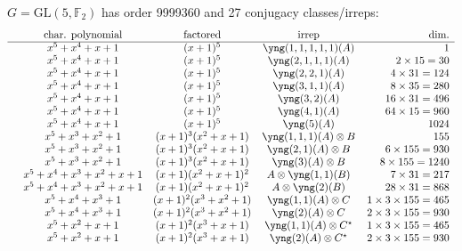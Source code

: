 \documentclass[11pt,oneside]{article}
\newcommand{\GL}{\mathrm{GL}}
\newcommand{\Field}{\mathbb{F}}
\newcommand{\hsp}{\ \ \ \ }
\newcommand{\tensor}{\otimes}
\begin{document}
$G=\GL(5,\Field_2)$ has order 9999360 and 27 conjugacy classes/irreps:
$$
\begin{array}{ccccr}
    &             \text{char. polynomial}  &  \text{factored} & \text{irrep} & \text{dim.}  \\
\hline
    &               x^5+x^4+x+1 &                 (x+1)^5 & \yng(1,1,1,1,1)(A)           &  1  \\
    &               x^5+x^4+x+1 &                 (x+1)^5 & \yng(2,1,1,1)(A)             &  2\times 15=30  \\
    &               x^5+x^4+x+1 &                 (x+1)^5 & \yng(2,2,1)(A)               &  4\times 31=124  \\
    &               x^5+x^4+x+1 &                 (x+1)^5 & \yng(3,1,1)(A)               &  8\times 35=280  \\
    &               x^5+x^4+x+1 &                 (x+1)^5 & \yng(3,2)(A)                 &  16\times 31=496  \\
    &               x^5+x^4+x+1 &                 (x+1)^5 & \yng(4,1)(A)                 &  64\times 15=960  \\
    &               x^5+x^4+x+1 &                 (x+1)^5 & \yng(5)(A)                   &  1024  \\
    &             x^5+x^3+x^2+1 &       (x+1)^3(x^2+x+1)  & \yng(1,1,1)(A)\tensor B      &  155   \\
    &             x^5+x^3+x^2+1 &       (x+1)^3(x^2+x+1)  & \yng(2,1)(A)\tensor B        &  6\times 155=930   \\
    &             x^5+x^3+x^2+1 &       (x+1)^3(x^2+x+1)  & \yng(3)(A)\tensor B          &  \hsp 8\times 155=1240   \\
    &       x^5+x^4+x^3+x^2+x+1 &       (x+1)(x^2+x+1)^2  & A\tensor\yng(1,1)(B)         &  7 \times 31 = 217  \\
    &       x^5+x^4+x^3+x^2+x+1 &       (x+1)(x^2+x+1)^2  & A\tensor \yng(2)(B)          &  28 \times 31 = 868  \\
    &             x^5+x^4+x^3+1 &     (x+1)^2(x^3+x^2+1)  & \yng(1,1)(A)\tensor C        &  1 \times 3 \times 155=465   \\
    &             x^5+x^4+x^3+1 &     (x+1)^2(x^3+x^2+1)  & \yng(2)(A)\tensor C          &  2 \times 3 \times 155=930  \\
    &               x^5+x^2+x+1 &       (x+1)^2(x^3+x+1)  & \yng(1,1)(A)\tensor C^{\star}&  1 \times 3 \times 155=465   \\
    &               x^5+x^2+x+1 &       (x+1)^2(x^3+x+1)  & \yng(2)(A)\tensor C^{\star}  &  2 \times 3 \times 155=930   \\

\end{array}$$
\end{document}
